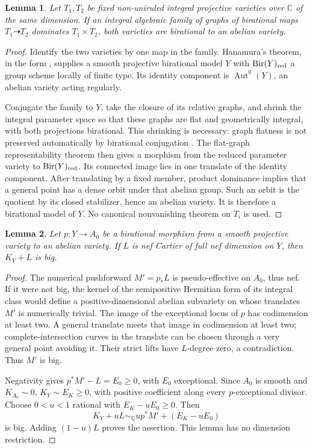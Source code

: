 \documentclass[12pt,a4paper,psamsfonts]{amsart}
\theoremstyle{definition}
\theoremstyle{plain}
\newtheorem{lemma}{Lemma}[section]
\newcommand{\Q}{\mathbb Q}
\newcommand{\C}{\mathbb C}
\begin{document}
\begin{lemma}\label{lem:fixed-graphs}
Let $T_1,T_2$ be fixed non-uniruled integral projective varieties
over $\C$ of the same dimension. If an integral algebraic family
of graphs of birational maps $T_1\dashrightarrow T_2$ dominates
$T_1\times T_2$, both varieties are birational to an abelian variety.
\end{lemma}
\begin{proof}
Identify the two varieties by one map in the family.
Hanamura's theorem, in the form
\cite[Theorem~3.8]{Blanc}, supplies a smooth projective birational
model $Y$ with $\operatorname{Bir}(Y)_{\rm red}$ a group scheme
locally of finite type. Its identity component is
$\operatorname{Aut}^0(Y)$, an abelian variety acting regularly.

Conjugate the family to $Y$, take the closure of its relative
graphs, and shrink the integral parameter space so that these
graphs are flat and geometrically integral, with both projections
birational. This shrinking is necessary: graph flatness is not
preserved automatically by birational conjugation
\cite[Remark~3.6]{Blanc}. The flat-graph representability theorem
\cite[Proposition~3.7]{Blanc} then gives a morphism from the
reduced parameter variety to $\operatorname{Bir}(Y)_{\rm red}$.
Its connected image lies in one translate of the identity component.
After translating by a fixed member, product dominance implies
that a general point has a dense orbit under that abelian group.
Such an orbit is the quotient by its closed stabilizer, hence an
abelian variety. It is therefore a birational model of $Y$.
No canonical nonvanishing theorem on $T_i$ is used.
\end{proof}

\begin{lemma}\label{lem:abelian-adjoint}
Let $p:Y\to A_0$ be a birational morphism from a smooth projective
variety to an abelian variety. If $L$ is nef Cartier of full nef
dimension on $Y$, then $K_Y+L$ is big.
\end{lemma}
\begin{proof}
The numerical pushforward $M'=p_*L$ is pseudo-effective on $A_0$,
thus nef. If it were not big, the kernel of the semipositive
Hermitian form of its integral class would define a
positive-dimensional abelian subvariety on whose translates $M'$
is numerically trivial. The image of the exceptional locus of $p$
has codimension at least two. A general translate meets that image
in codimension at least two; complete-intersection curves in the
translate can be chosen through a very general point avoiding it.
Their strict lifts have $L$-degree zero, a contradiction. Thus $M'$
is big.

Negativity gives $p^*M'-L=E_0\ge0$, with $E_0$ exceptional.
Since $A_0$ is smooth and $K_{A_0}\sim0$, $K_Y\sim E_K\ge0$,
with positive coefficient along every $p$-exceptional divisor.
Choose $0<u<1$ rational with $E_K-uE_0\ge0$. Then
\[
 K_Y+uL\sim_\Q up^*M'+(E_K-uE_0)
\]
is big. Adding $(1-u)L$ proves the assertion. This lemma has no
dimension restriction.
\end{proof}
\end{document}
